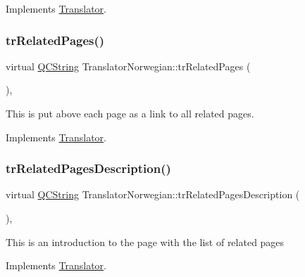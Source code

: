 Implements \mbox{\hyperlink{class_translator}{Translator}}.

\mbox{\label{class_translator_norwegian_a7cfa9bfcbfb2ab088ae4cfd8d8e57060}} 
\subsubsection{\texorpdfstring{trRelatedPages()}{trRelatedPages()}}
{\footnotesize\ttfamily virtual \mbox{\hyperlink{class_q_c_string}{Q\+C\+String}} Translator\+Norwegian\+::tr\+Related\+Pages (\begin{DoxyParamCaption}{ }\end{DoxyParamCaption})\hspace{0.3cm}{\ttfamily [inline]}, {\ttfamily [virtual]}}

This is put above each page as a link to all related pages. 

Implements \mbox{\hyperlink{class_translator}{Translator}}.

\mbox{\label{class_translator_norwegian_a0bb96adb596a9b6c878033df8b6e270b}} 
\subsubsection{\texorpdfstring{trRelatedPagesDescription()}{trRelatedPagesDescription()}}
{\footnotesize\ttfamily virtual \mbox{\hyperlink{class_q_c_string}{Q\+C\+String}} Translator\+Norwegian\+::tr\+Related\+Pages\+Description (\begin{DoxyParamCaption}{ }\end{DoxyParamCaption})\hspace{0.3cm}{\ttfamily [inline]}, {\ttfamily [virtual]}}

This is an introduction to the page with the list of related pages 

Implements \mbox{\hyperlink{class_translator}{Translator}}.

\mbox{\label{class_translator_norwegian_a064c4bfe9bb5288d0c19bb214f1732b9}} 
